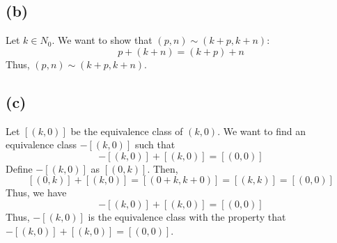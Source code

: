 \documentclass{article}
\begin{document}
\subsection*{(b)}
Let \(k \in N_0\). We want to show that \((p, n) \sim (k + p, k + n)\):
\[
   p + (k + n) = (k + p) + n
\]
Thus,
\((p, n) \sim (k + p, k + n)\).
\subsection*{(c)}
Let \([(k, 0)]\) be the equivalence class of \((k, 0)\). We want to find an equivalence class \(-[(k, 0)]\) such that
\[
   -[(k, 0)] + [(k, 0)] = [(0, 0)]
\]
Define \(-[(k, 0)]\) as \([(0, k)]\). Then,
\[
   [(0, k)] + [(k, 0)] = [(0 + k, k + 0)] = [(k, k)] = [(0, 0)]
\]
Thus, we have
\[
   -[(k, 0)] + [(k, 0)] = [(0, 0)]
\]
Thus, \(-[(k, 0)]\) is the equivalence class with the property that
\(-[(k, 0)] + [(k, 0)] = [(0, 0)]\).
\end{document}
